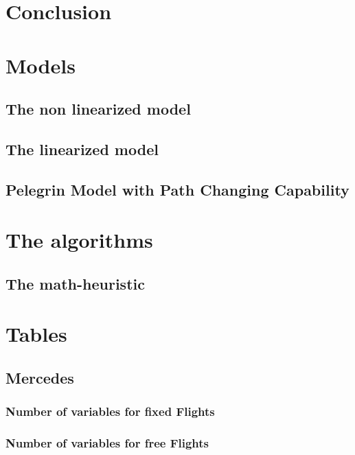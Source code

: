 \documentclass[a4paper,12pt]{report}
\begin{document}
\chapter{Conclusion}\label{chap:conclusion}

%

\printbibliography

\appendix 
\chapter{Models} 
\section{The non linearized model}\label{sec:wholeModel}
 
\section{The linearized model}\label{sec:linearModel}

\section{Pelegrin Model with Path Changing Capability}\label{sec:MercedesModifedModel}

\chapter{The algorithms}
\section{The math-heuristic}\label{alg:matheuristic}

\chapter{Tables}
\section{Mercedes}
\subsection{Number of variables for fixed Flights}

\subsection{Number of variables for free Flights}

\end{document}
